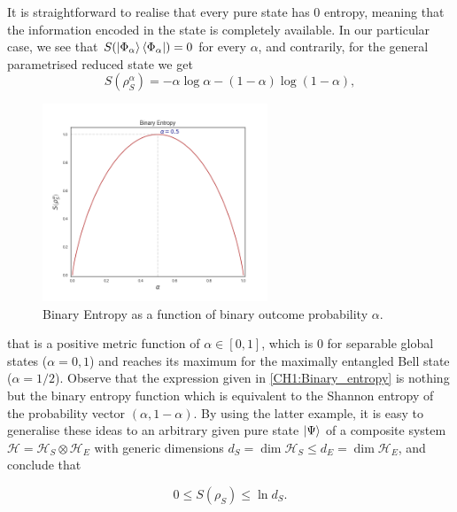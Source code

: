 \indent It is straightforward to realise that every pure state has $0$ entropy, meaning that the information encoded in the state is completely available. In our particular case, we see that $S(\mathinner{|{\Phi_\alpha}\rangle}\mathinner{\langle{\Phi_\alpha}|})=0$ for every $\alpha$, and contrarily, for the general parametrised reduced state we get
\begin{equation}
S\left(\rho_{S}^{\alpha}\right)=-\alpha \log \alpha-(1-\alpha) \log (1-\alpha),
\label{CH1:Binary_entropy}
\end{equation}
\begin{figure}[h!]
\centering
\includegraphics[width=0.6\textwidth]{Figures/Binary_entropy.png}
\caption{Binary Entropy  as a function of binary outcome probability $\alpha$.}
\end{figure}
that is a positive metric function of $\alpha\in [0,1]$, which is 0 for separable global states ($\alpha=0,1$) and reaches its maximum for the maximally entangled Bell state ($\alpha=1/2$). Observe that the expression given in \eqref{CH1:Binary_entropy} is nothing but the binary entropy function \cite{mackay_information_2003} which is equivalent to the Shannon entropy \cite{shannon_mathematical_1948} of the probability vector $(\alpha,1-\alpha)$. By using the latter example, it is easy to generalise these ideas to an arbitrary given pure state $\mathinner{|{\Psi}\rangle}$ of a composite system $\mathcal{H}=\mathcal{H}_{S}\otimes\mathcal{H}_{E}$ with generic dimensions $d_S = \operatorname{dim}\mathcal{H}_{S}\leq d_E = \operatorname{dim}\mathcal{H}_E$, and conclude that

\begin{equation}
0\leq S(\rho_S)\leq \ln d_S.
\label{CH1:inequality_entropy}
\end{equation}

